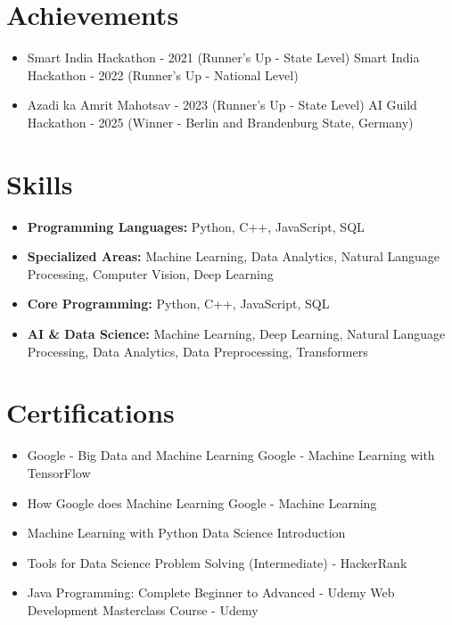 \documentclass[a4paper,10pt]{article}
\begin{document}
\section*{Achievements}
\begin{itemize}
\item Smart India Hackathon - 2021 (Runner's Up - State Level) \hfill Smart India Hackathon - 2022 (Runner's Up - National Level)
\item Azadi ka Amrit Mahotsav - 2023 (Runner's Up - State Level) \hfill AI Guild Hackathon - 2025 (Winner - Berlin and Brandenburg State, Germany)
\end{itemize}

\section*{Skills}
\begin{itemize}
  \item \textbf{Programming Languages:} Python, C++, JavaScript, SQL
  \item \textbf{Specialized Areas:} Machine Learning, Data Analytics, Natural Language Processing, Computer Vision, Deep Learning
  \item \textbf{Core Programming:} Python, C++, JavaScript, SQL
  \item \textbf{AI \& Data Science:} Machine Learning, Deep Learning, Natural Language Processing, Data Analytics, Data Preprocessing, Transformers
\end{itemize}

\section*{Certifications}
\begin{itemize}
\item Google - Big Data and Machine Learning \hfill Google - Machine Learning with TensorFlow
\item How Google does Machine Learning \hfill Google - Machine Learning
\item Machine Learning with Python \hfill Data Science Introduction
\item Tools for Data Science \hfill Problem Solving (Intermediate) - HackerRank
\item Java Programming: Complete Beginner to Advanced - Udemy \hfill Web Development Masterclass Course - Udemy
\end{itemize}
\end{document}
